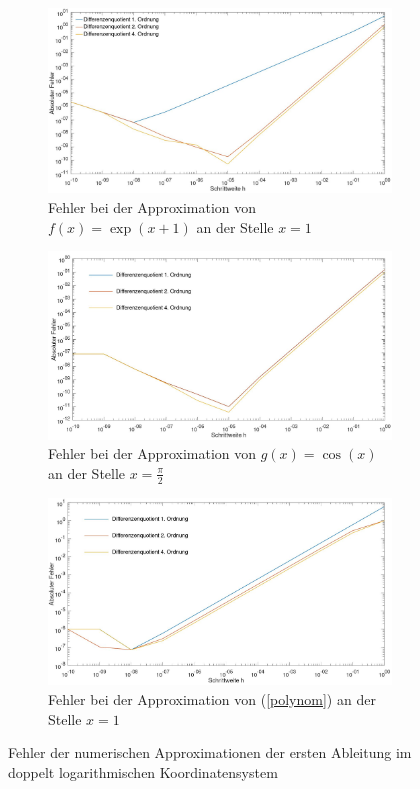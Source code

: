 \begin{figure}[thbp]
	\centering
	\begin{subfigure}[tpbh]{0.68\textwidth}
		\centering
		\includegraphics[width=\textwidth]{data/eFunktion}
		\caption{Fehler bei der Approximation von $f(x) = \exp(x+1)$ an der Stelle $x=1$}
		\label{fig:eFunktion}
	\end{subfigure}
	\begin{subfigure}[tpbh]{0.68\textwidth}
		\centering
		\includegraphics[width=\textwidth]{data/sinus}
		\caption{Fehler bei der Approximation von $g(x) = \cos(x)$ an der Stelle $x=\frac{\pi}{2}$}
		\label{fig:cosinus}
	\end{subfigure}
	\begin{subfigure}[tpbh]{0.68\textwidth}
		\centering
		\includegraphics[width=\textwidth]{data/abschnittsFkt}
		\caption{Fehler bei der Approximation von (\ref{polynom}) an der Stelle $x=1$ }
		\label{fig:Polynom}
	\end{subfigure}
	\caption{Fehler der numerischen Approximationen der ersten Ableitung im doppelt logarithmischen Koordinatensystem}
	\label{fig:fehlerPlots}
\end{figure}



